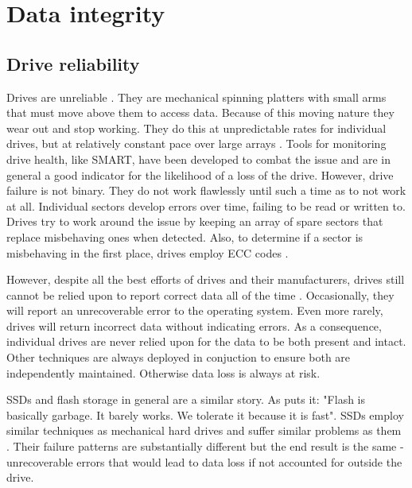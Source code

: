     \section{Data integrity}

        \subsection{Drive reliability}
            \label{sec:reliability}

            Drives are unreliable \cite{RAID, Backblaze_stats}. They are
            mechanical spinning platters with small arms that must move above
            them to access data. Because of this moving nature they wear out
            and stop working. They do
            this at unpredictable rates for individual drives, but at
            relatively constant pace over large arrays \cite{Backblaze_stats}.
            Tools for monitoring drive health, like SMART, have been developed
            to combat the issue and are in general a good indicator for the
            likelihood of a loss of the drive. However, drive failure is not binary. They do not work flawlessly
            until such a time as to not work at all. Individual sectors develop
            errors over time, failing to be read or written to. Drives try to
            work around the issue by keeping an array of spare sectors that replace
            misbehaving ones when detected. Also, to determine if a sector is
            misbehaving in the first place, drives employ ECC codes
            \cite{data_corruption_storage_stack}.

            However, despite all the best efforts of drives and their
            manufacturers, drives still cannot be relied upon to report correct
            data all of the time \cite{data_corruption_storage_stack}.
            Occasionally, they will report an unrecoverable error to the
            operating system. Even more rarely, drives will return incorrect
            data without indicating errors. As a consequence, individual drives
            are never relied upon for the data to be both present and intact.
            Other techniques are always deployed in conjuction to ensure both are
            independently maintained. Otherwise data loss is always at risk.

            SSDs and flash storage in general are a similar story. As
             puts it: "Flash is basically garbage. It
            barely works. We tolerate it because it is fast". SSDs employ
            similar techniques as mechanical hard drives and suffer similar
            problems as them \cite{flash_large_scale, flash_reliability}. Their
            failure patterns are substantially different but the end result is
            the same - unrecoverable errors that would lead to data loss if not
            accounted for outside the drive.


